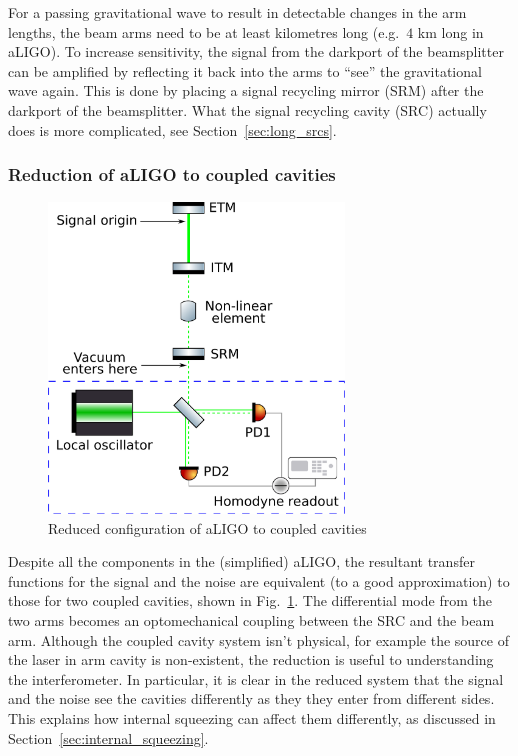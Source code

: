 \documentclass[aps,pra,superscriptaddress,reprint,nofootinbib]{revtex4-1}
\begin{document}
For a passing gravitational wave to result in detectable changes in the arm lengths, the beam arms need to be at least kilometres long (e.g.\ $4$ km long in aLIGO). To increase sensitivity, the signal from the darkport of the beamsplitter can be amplified by reflecting it back into the arms to ``see'' the gravitational wave again. This is done by placing a signal recycling mirror (SRM) after the darkport of the beamsplitter. What the signal recycling cavity (SRC) actually does is more complicated, see Section~\ref{sec:long_srcs}.


\subsubsection{Reduction of aLIGO to coupled cavities}

\begin{figure}
	\begin{center}
	\includegraphics[width=0.7\textwidth]{figures/aLIGO_as_coupled_cavities.pdf}
	\end{center}
	\caption{Reduced configuration of aLIGO to coupled cavities}
	\label{fig:aLIGO_as_coupled_cavities}
\end{figure}

Despite all the components in the (simplified) aLIGO, the resultant transfer functions for the signal and the noise are equivalent (to a good approximation) to those for two coupled cavities, shown in Fig.~\ref{fig:aLIGO_as_coupled_cavities}. The differential mode from the two arms becomes an optomechanical coupling between the SRC and the beam arm.
Although the coupled cavity system isn’t physical, for example the source of the laser in arm cavity is non-existent, the reduction is useful to understanding the interferometer. In particular, it is clear in the reduced system that the signal and the noise see the cavities differently as they they enter from different sides. This explains how internal squeezing can affect them differently, as discussed in Section~\ref{sec:internal_squeezing}.
\end{document}
